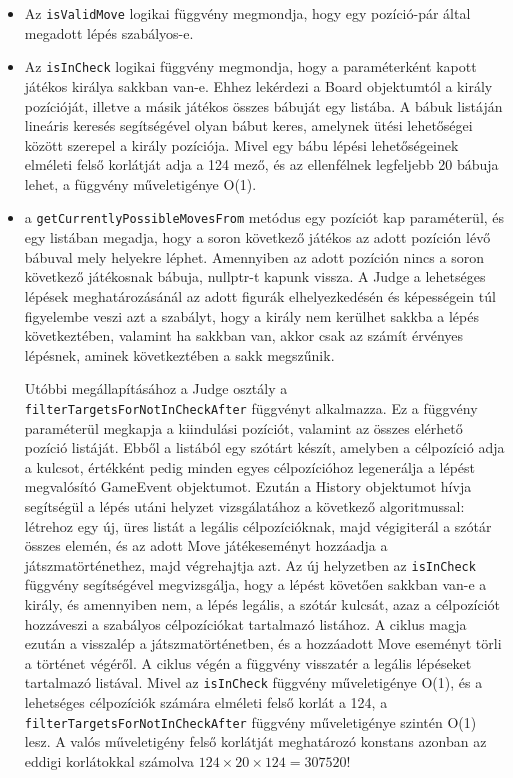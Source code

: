 \documentclass[12pt, twoside]{report}
\begin{document}
\begin{itemize}
	\item Az {\tt isValidMove} logikai függvény megmondja, hogy egy pozíció-pár által megadott lépés szabályos-e.
	
	\item Az {\tt isInCheck} logikai függvény megmondja, hogy a paraméterként kapott játékos királya sakkban van-e. Ehhez lekérdezi a Board objektumtól a király pozícióját, illetve a másik játékos összes bábuját egy listába. A bábuk listáján lineáris keresés segítségével olyan bábut keres, amelynek ütési lehetőségei között szerepel a király pozíciója. Mivel egy bábu lépési lehetőségeinek elméleti felső korlátját adja a 124 mező, és az ellenfélnek legfeljebb 20 bábuja lehet, a függvény műveletigénye O(1).
	
	\item a {\tt getCurrentlyPossibleMovesFrom} metódus egy pozíciót kap paraméterül,  és egy listában megadja, hogy a soron következő játékos az adott pozíción lévő bábuval mely helyekre léphet. Amennyiben az adott pozíción nincs a soron következő játékosnak bábuja, nullptr-t kapunk vissza. A Judge a lehetséges lépések meghatározásánál az adott figurák elhelyezkedésén és képességein túl figyelembe veszi azt a szabályt, hogy a király nem kerülhet sakkba a lépés következtében, valamint ha sakkban van, akkor csak az számít érvényes lépésnek, aminek következtében a sakk megszűnik.
	
	Utóbbi megállapításához a Judge osztály a {\tt filterTargetsForNotInCheckAfter} függvényt alkalmazza. Ez a függvény paraméterül megkapja a kiindulási pozíciót, valamint az összes elérhető pozíció listáját. Ebből a listából egy szótárt készít, amelyben a célpozíció adja a kulcsot, értékként pedig minden egyes célpozícióhoz legenerálja a lépést megvalósító GameEvent objektumot. Ezután a History objektumot hívja segítségül a lépés utáni helyzet vizsgálatához a következő algoritmussal: létrehoz egy új, üres listát a legális célpozícióknak, majd végigiterál a szótár összes elemén, és az adott Move játékeseményt hozzáadja a játszmatörténethez, majd végrehajtja azt. Az új helyzetben az {\tt isInCheck} függvény segítségével megvizsgálja, hogy a lépést követően sakkban van-e a király, és amennyiben nem, a lépés legális, a szótár kulcsát, azaz a célpozíciót hozzáveszi a szabályos célpozíciókat tartalmazó listához. A ciklus magja ezután a visszalép a játsz\-ma\-tör\-té\-net\-ben, és a hozzáadott Move eseményt törli a történet végéről. A ciklus végén a függvény visszatér a legális lépéseket tartalmazó listával. Mivel az {\tt isInCheck} függvény műveletigénye O(1), és a lehetséges célpozíciók számára elméleti felső korlát a 124, a {\tt filterTargetsForNotInCheckAfter} függvény műveletigénye szintén O(1) lesz. A valós műveletigény felső korlátját meghatározó konstans azonban az eddigi korlátokkal számolva $124 \times 20 \times 124 = 307520$!


\end{itemize}
\end{document}
